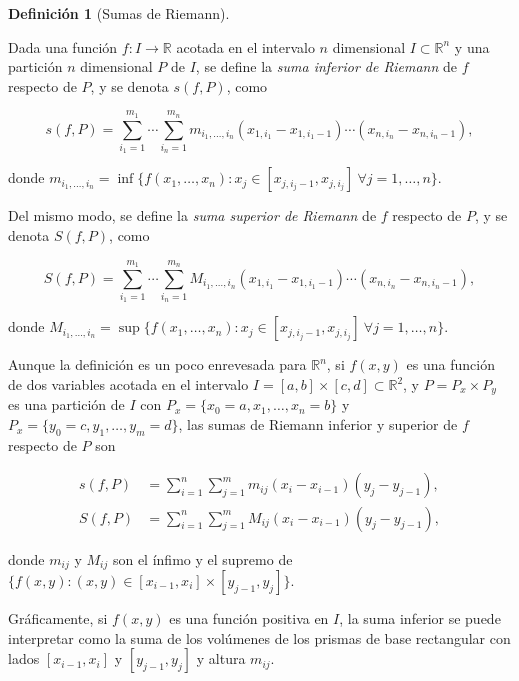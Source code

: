 \documentclass[
  a4paper,
]{scrreport}
\theoremstyle{plain}
\theoremstyle{definition}
\theoremstyle{plain}
\theoremstyle{plain}
\theoremstyle{definition}
\theoremstyle{definition}
\newtheorem{definition}{Definición}[chapter]
\theoremstyle{remark}
\begin{document}
\begin{definition}[Sumas de
Riemann]\protect\hypertarget{def-suma-inferior-superior-riemann-n-dimensional}{}\label{def-suma-inferior-superior-riemann-n-dimensional}

Dada una función \(f:I\to \mathbb{R}\) acotada en el intervalo \(n\)
dimensional \(I\subset \mathbb{R}^n\) y una partición \(n\) dimensional
\(P\) de \(I\), se define la \emph{suma inferior de Riemann} de \(f\)
respecto de \(P\), y se denota \(s(f,P)\), como

\[
s(f,P) = \sum_{i_1=1}^{m_1}\cdots \sum_{i_n=1}^{m_n} m_{i_1,\ldots,i_n} (x_{1,i_1}-x_{1,i_1-1})\cdots (x_{n,i_n}-x_{n,i_n-1}),
\]

donde
\(m_{i_1,\ldots,i_n} = \inf\{f(x_1,\ldots,x_n): x_j\in[x_{j,i_j-1}, x_{j,i_j}]\ \forall j=1,\ldots, n\}\).

Del mismo modo, se define la \emph{suma superior de Riemann} de \(f\)
respecto de \(P\), y se denota \(S(f,P)\), como

\[
S(f,P) = \sum_{i_1=1}^{m_1}\cdots \sum_{i_n=1}^{m_n} M_{i_1,\ldots,i_n} (x_{1,i_1}-x_{1,i_1-1})\cdots (x_{n,i_n}-x_{n,i_n-1}),
\]

donde
\(M_{i_1,\ldots,i_n} = \sup\{f(x_1,\ldots,x_n): x_j\in[x_{j,i_j-1}, x_{j,i_j}]\ \forall j=1,\ldots, n\}\).

\end{definition}

Aunque la definición es un poco enrevesada para \(\mathbb{R}^n\), si
\(f(x,y)\) es una función de dos variables acotada en el intervalo
\(I=[a,b]\times [c,d]\subset \mathbb{R}^2\), y \(P=P_x\times P_y\) es
una partición de \(I\) con \(P_x=\{x_0=a,x_1,\ldots, x_n=b\}\) y
\(P_x=\{y_0=c,y_1,\ldots, y_m=d\}\), las sumas de Riemann inferior y
superior de \(f\) respecto de \(P\) son

\begin{align*}
s(f,P) &= \sum_{i=1}^n \sum_{j=1}^m m_{ij}(x_i-x_{i-1})(y_j-y_{j-1}), \\
S(f,P) &= \sum_{i=1}^n \sum_{j=1}^m M_{ij}(x_i-x_{i-1})(y_j-y_{j-1}),
\end{align*}

donde \(m_{ij}\) y \(M_{ij}\) son el ínfimo y el supremo de
\(\{f(x,y): (x,y)\in [x_{i-1},x_i]\times [y_{j-1},y_j]\}\).

Gráficamente, si \(f(x,y)\) es una función positiva en \(I\), la suma
inferior se puede interpretar como la suma de los volúmenes de los
prismas de base rectangular con lados \([x_{i-1},x_i]\) y
\([y_{j-1},y_j]\) y altura \(m_{ij}\).
\end{document}
